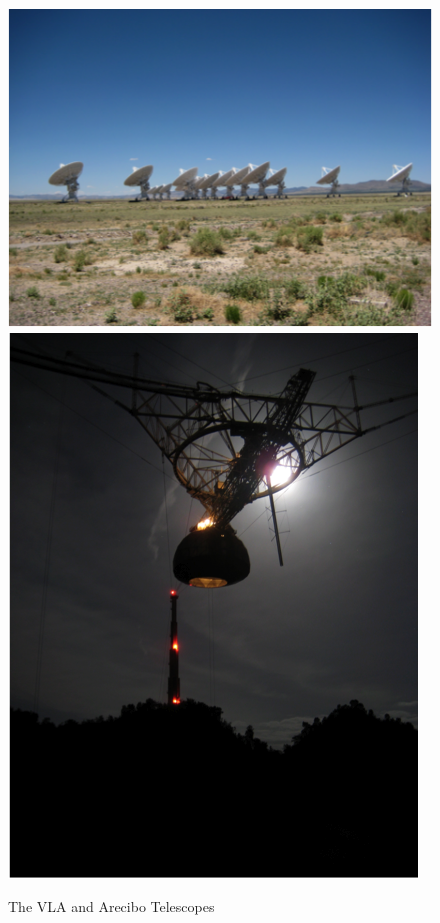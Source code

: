 \begin{figure}[ht!]
  \centering
    \includegraphics[height=0.35\textheight]{Images/C1/vla.png}
    \includegraphics[height=0.35\textheight]{Images/C1/arecibo.png}
  \caption[The VLA and Arecibo Telescopes]{The VLA and Arecibo Telescopes}
  \label{fig: C1/telescopes}
\end{figure}

